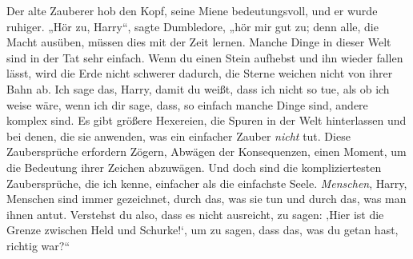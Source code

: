 Der alte Zauberer hob den Kopf, seine Miene bedeutungsvoll, und er wurde ruhiger. „Hör zu, Harry“, sagte Dumbledore, „hör mir gut zu; denn alle, die Macht ausüben, müssen dies mit der Zeit lernen. Manche Dinge in dieser Welt sind in der Tat sehr einfach. Wenn du einen Stein aufhebst und ihn wieder fallen lässt, wird die Erde nicht schwerer dadurch, die Sterne weichen nicht von ihrer Bahn ab. Ich sage das, Harry, damit du weißt, dass ich nicht so tue, als ob ich weise wäre, wenn ich dir sage, dass, so einfach manche Dinge sind, andere komplex sind. Es gibt größere Hexereien, die Spuren in der Welt hinterlassen und bei denen, die sie anwenden, was ein einfacher Zauber \emph{nicht} tut. Diese Zaubersprüche erfordern Zögern, Abwägen der Konsequenzen, einen Moment, um die Bedeutung ihrer Zeichen abzuwägen. Und doch sind die kompliziertesten Zaubersprüche, die ich kenne, einfacher als die einfachste Seele. \emph{Menschen}, Harry, Menschen sind immer gezeichnet, durch das, was sie tun und durch das, was man ihnen antut. Verstehst du also, dass es nicht ausreicht, zu sagen: ‚Hier ist die Grenze zwischen Held und Schurke!‘, um zu sagen, dass das, was du getan hast, richtig war?“

